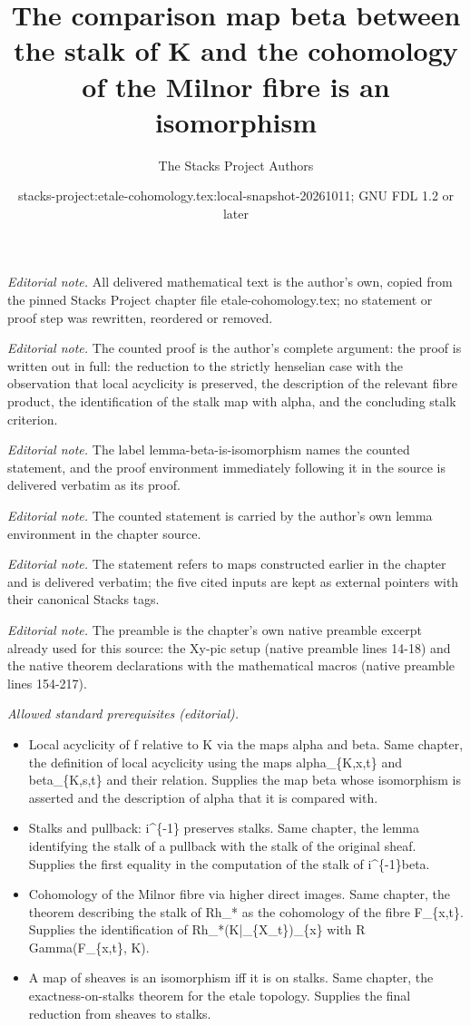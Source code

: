 \documentclass[10pt,a4paper]{amsart}
\title{The comparison map beta between the stalk of K and the cohomology of the Milnor fibre is an isomorphism}
\author{The Stacks Project Authors}
\date{stacks-project:etale-cohomology.tex:local-snapshot-20261011; GNU FDL 1.2 or later}
\theoremstyle{plain}
\theoremstyle{definition}
\theoremstyle{remark}
\numberwithin{equation}{subsection}
\begin{document}
\maketitle
\noindent\textit{Editorial note.} All delivered mathematical text is the author's own, copied from the pinned Stacks Project chapter file etale-cohomology.tex; no statement or proof step was rewritten, reordered or removed.\par\medskip
\noindent\textit{Editorial note.} The counted proof is the author's complete argument: the proof is written out in full: the reduction to the strictly henselian case with the observation that local acyclicity is preserved, the description of the relevant fibre product, the identification of the stalk map with alpha, and the concluding stalk criterion.\par\medskip
\noindent\textit{Editorial note.} The label lemma-beta-is-isomorphism names the counted statement, and the proof environment immediately following it in the source is delivered verbatim as its proof.\par\medskip
\noindent\textit{Editorial note.} The counted statement is carried by the author's own lemma environment in the chapter source.\par\medskip
\noindent\textit{Editorial note.} The statement refers to maps constructed earlier in the chapter and is delivered verbatim; the five cited inputs are kept as external pointers with their canonical Stacks tags.\par\medskip
\noindent\textit{Editorial note.} The preamble is the chapter's own native preamble excerpt already used for this source: the Xy-pic setup (native preamble lines 14-18) and the native theorem declarations with the mathematical macros (native preamble lines 154-217).\par\medskip
\noindent\textit{Allowed standard prerequisites (editorial).}\begin{itemize}
\item Local acyclicity of f relative to K via the maps alpha and beta. Same chapter, the definition of local acyclicity using the maps alpha\_\{K,x,t\} and beta\_\{K,s,t\} and their relation. Supplies the map beta whose isomorphism is asserted and the description of alpha that it is compared with.
\item Stalks and pullback: i\textasciicircum{}\{-1\} preserves stalks. Same chapter, the lemma identifying the stalk of a pullback with the stalk of the original sheaf. Supplies the first equality in the computation of the stalk of i\textasciicircum{}\{-1\}beta.
\item Cohomology of the Milnor fibre via higher direct images. Same chapter, the theorem describing the stalk of Rh\_* as the cohomology of the fibre F\_\{x,t\}. Supplies the identification of Rh\_*(K|\_\{X\_t\})\_\{x\} with R Gamma(F\_\{x,t\}, K).
\item A map of sheaves is an isomorphism iff it is on stalks. Same chapter, the exactness-on-stalks theorem for the etale topology. Supplies the final reduction from sheaves to stalks.
\end{itemize}\medskip
\end{document}
